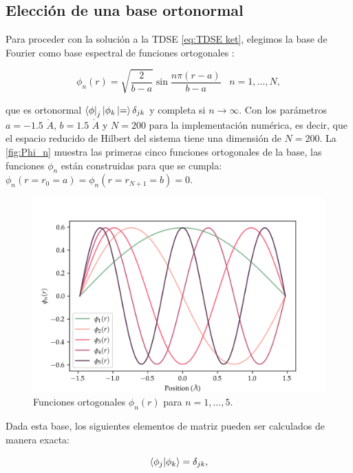 \subsection{Elección de una base ortonormal}

Para proceder con la solución a la \acs{TDSE} \autoref{eq:TDSE ket}, elegimos la base de Fourier como base espectral de funciones ortogonales \cite{Colbert1992}:

\begin{equation}
  \label{eq:eigenfunc}
  \phi_n(r)=\sqrt{\frac{2}{b-a}}\sin \frac{n\pi(r-a)}{b-a} \,\,\,\,\, n=1,\dots,N,
\end{equation}

que es ortonormal $\bra\phi_j|\phi_k\ket = \delta_{jk}$ y completa si $n \to \infty$. 
Con los parámetros $a=-1.5\,\,\mathring{A}$, $b=1.5\,\,\mathring{A}$ y $N=200$ para la implementación numérica, es decir, que el espacio reducido de Hilbert del sistema tiene una dimensión de $N=200$.
La \autoref{fig:Phi_n} muestra las primeras cinco funciones ortogonales de la base, las funciones $\phi_n$ están construidas para que se cumpla: $\phi_n(r=r_0=a)=\phi_n(r=r_{N+1}=b)=0$.

\begin{figure}[ht]
  \centering
  \includegraphics[width=1\textwidth]{./img/Phi_n1.png}
  \caption{Funciones ortogonales $\phi_n(r)$ para $n=1,\dots,5$.}
  \label{fig:Phi_n}
\end{figure}

Dada esta base, los siguientes elementos de matriz pueden ser calculados de manera exacta:

\begin{equation}
  \label{eq:trash}
  \bra{\phi_j}\ket{\phi_k} = \delta_{jk},
\end{equation}

